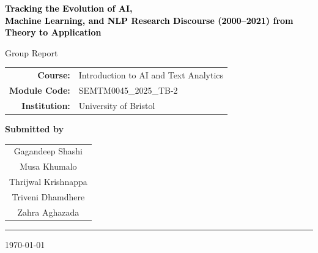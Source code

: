 \begin{titlepage}
    \thispagestyle{empty}
    \centering

    \vspace*{2cm}

    {\Huge \bfseries {\textcolor{black}{Tracking the Evolution of AI, \\ Machine Learning, and NLP Research Discourse (2000--2021) from Theory to Application}}
    }\par
    \vspace{0.8cm}

    \vspace{2cm}

    {\Large Group Report\par}

    \vspace{2.5cm}

    \begin{tabular}{rl}
        \textbf{Course:} & Introduction to AI and Text Analytics \\
        \textbf{Module Code:} & SEMTM0045\_2025\_TB-2\\
        \textbf{Institution:} & University of Bristol \\
    \end{tabular}

    \vspace{2cm}

    {\large \textbf{Submitted by}\par}
    \vspace{0.5cm}

    \begin{tabular}{c}
        Gagandeep Shashi\\
        Musa Khumalo\\
        Thrijwal Krishnappa\\
        Triveni Dhamdhere \\
        Zahra Aghazada \\
    \end{tabular}

    \vfill

    \rule{0.8\textwidth}{0.4pt}

    \vspace{0.5cm}
    {\small \today\par}

\end{titlepage}